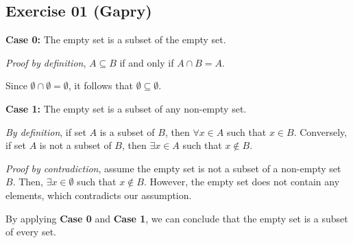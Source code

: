 \subsection*{Exercise 01 (Gapry)}

\begin{flushleft}
\textbf{Case 0:} The empty set is a subset of the empty set.

\textit{Proof by definition}, $A \subseteq B$ if and only if $A \cap B = A$.

Since $\emptyset \cap \emptyset = \emptyset$, it follows that $\emptyset \subseteq \emptyset$. 
\end{flushleft}

\begin{flushleft}
\textbf{Case 1:} The empty set is a subset of any non-empty set.

\textit{By definition}, if set $A$ is a subset of $B$, then $\forall x \in A$ such that $x \in B$. Conversely, if set $A$ is not a subset of $B$, then $\exists x \in A$ such that $x \notin B$.

\textit{Proof by contradiction}, assume the empty set is not a subset of a non-empty set $B$. Then, $\exists x \in \emptyset$ such that $x \notin B$. However, the empty set does not contain any elements, which contradicts our assumption.
\end{flushleft}

\begin{flushleft}
By applying \textbf{Case 0} and \textbf{Case 1}, we can conclude that the empty set is a subset of every set.
\end{flushleft}
